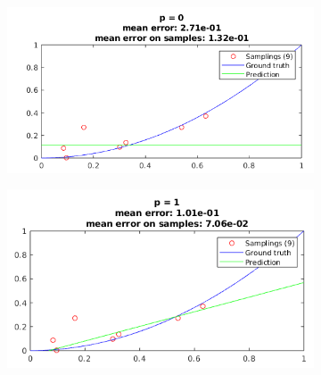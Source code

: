 \documentclass[12pt]{article}
\begin{document}
\begin{figure}[H]
  \centering
  \begin{subfigure}{0.45\textwidth}
    \includegraphics[width=\textwidth]{plots/regression/p_eq_0.png}
  \end{subfigure}
  \begin{subfigure}{0.45\textwidth}
    \includegraphics[width=\textwidth]{plots/regression/p_eq_1.png}
  \end{subfigure}
\end{figure}
\end{document}
